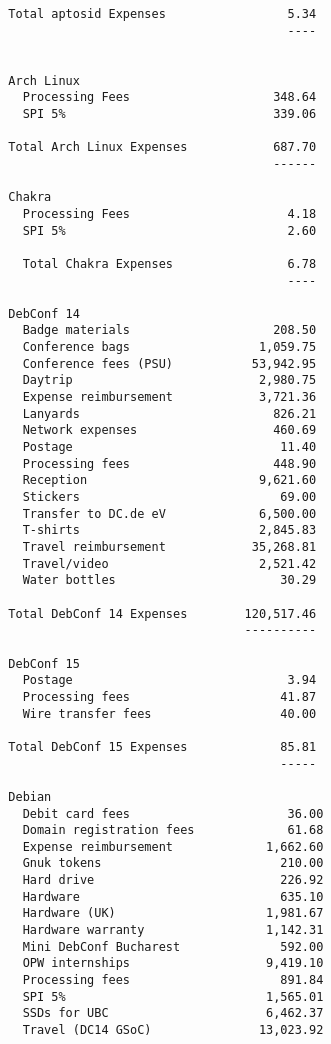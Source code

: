 \documentclass[letterpaper]{report}
\begin{document}
\begin{verbatim}
  Total aptosid Expenses                 5.34
                                         ----


  Arch Linux
    Processing Fees                    348.64
    SPI 5%                             339.06

  Total Arch Linux Expenses            687.70
                                       ------

  Chakra
    Processing Fees                      4.18
    SPI 5%                               2.60

    Total Chakra Expenses                6.78
                                         ----

  DebConf 14
    Badge materials                    208.50
    Conference bags                  1,059.75
    Conference fees (PSU)           53,942.95
    Daytrip                          2,980.75
    Expense reimbursement            3,721.36
    Lanyards                           826.21
    Network expenses                   460.69
    Postage                             11.40
    Processing fees                    448.90
    Reception                        9,621.60
    Stickers                            69.00
    Transfer to DC.de eV             6,500.00
    T-shirts                         2,845.83
    Travel reimbursement            35,268.81
    Travel/video                     2,521.42
    Water bottles                       30.29

  Total DebConf 14 Expenses        120,517.46
                                   ----------

  DebConf 15
    Postage                              3.94
    Processing fees                     41.87
    Wire transfer fees                  40.00

  Total DebConf 15 Expenses             85.81
                                        -----

  Debian
    Debit card fees                      36.00
    Domain registration fees             61.68
    Expense reimbursement             1,662.60
    Gnuk tokens                         210.00
    Hard drive                          226.92
    Hardware                            635.10
    Hardware (UK)                     1,981.67
    Hardware warranty                 1,142.31
    Mini DebConf Bucharest              592.00
    OPW internships                   9,419.10
    Processing fees                     891.84
    SPI 5%                            1,565.01
    SSDs for UBC                      6,462.37
    Travel (DC14 GSoC)               13,023.92


\end{verbatim}
\end{document}
